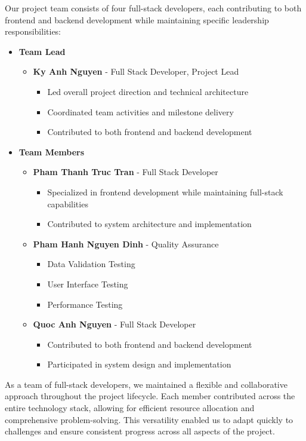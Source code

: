 Our project team consists of four full-stack developers, each contributing to both frontend and backend development while maintaining specific leadership responsibilities:

\begin{itemize}
    \item \textbf{Team Lead}
    \begin{itemize}
        \item \textbf{Ky Anh Nguyen} - Full Stack Developer, Project Lead
        \begin{itemize}
            \item Led overall project direction and technical architecture
            \item Coordinated team activities and milestone delivery
            \item Contributed to both frontend and backend development
        \end{itemize}
    \end{itemize}
    
    \item \textbf{Team Members}
    \begin{itemize}
        \item \textbf{Pham Thanh Truc Tran} - Full Stack Developer
        \begin{itemize}
            \item Specialized in frontend development while maintaining full-stack capabilities
            \item Contributed to system architecture and implementation
        \end{itemize}
        \item \textbf{Pham Hanh Nguyen Dinh} - Quality Assurance 
        \begin{itemize}
            \item Data Validation Testing
            \item User Interface Testing
            \item Performance Testing            
        \end{itemize}
        \item \textbf{Quoc Anh Nguyen} - Full Stack Developer
        \begin{itemize}
            \item Contributed to both frontend and backend development
            \item Participated in system design and implementation
        \end{itemize}
    \end{itemize}
\end{itemize}

As a team of full-stack developers, we maintained a flexible and collaborative approach throughout the project lifecycle. Each member contributed across the entire technology stack, allowing for efficient resource allocation and comprehensive problem-solving. This versatility enabled us to adapt quickly to challenges and ensure consistent progress across all aspects of the project.